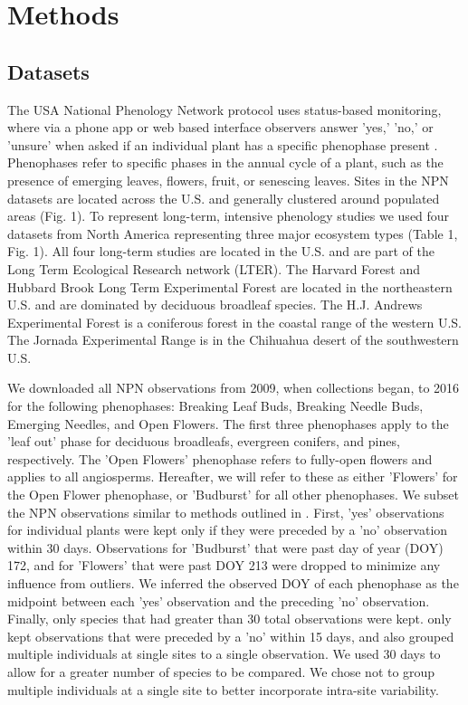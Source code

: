 \documentclass[fleqn,12pt,lineno]{article}
\begin{document}
\section*{Methods}

\subsection*{Datasets}

The USA National Phenology Network protocol uses status-based monitoring, where via a phone app or web based interface observers answer 'yes,' 'no,' or 'unsure' when asked if an individual plant has a specific phenophase present \citep{denny2014}. Phenophases refer to specific phases in the annual cycle of a plant, such as the presence of emerging leaves, flowers, fruit, or senescing leaves. Sites in the NPN datasets are located across the U.S. and generally clustered around populated areas (Fig. 1). To represent long-term, intensive phenology studies we used four datasets from North America representing three major ecosystem types (Table 1, Fig. 1). All four long-term studies are located in the U.S. and are part of the Long Term Ecological Research network (LTER). The Harvard Forest and Hubbard Brook Long Term Experimental Forest are located in the northeastern U.S. and are dominated by deciduous broadleaf species. The H.J. Andrews Experimental Forest is a coniferous forest in the coastal range of the western U.S. The Jornada Experimental Range is in the Chihuahua desert of the southwestern U.S. 

We downloaded all NPN observations from 2009, when collections began, to 2016 for the following phenophases: Breaking Leaf Buds, Breaking Needle Buds, Emerging Needles, and Open Flowers. The first three phenophases apply to the 'leaf out' phase for deciduous broadleafs, evergreen conifers, and pines, respectively. The 'Open Flowers' phenophase refers to fully-open flowers and applies to all angiosperms. Hereafter, we will refer to these as either 'Flowers' for the Open Flower phenophase, or 'Budburst' for all other phenophases. We subset the NPN observations similar to methods outlined in \cite{crimmins2017}. First, 'yes' observations for individual plants were kept only if they were preceded by a 'no' observation within 30 days. Observations for 'Budburst' that were past day of year (DOY) 172, and for 'Flowers' that were past DOY 213 were dropped to minimize any influence from outliers. We inferred the observed DOY of each phenophase as the midpoint between each 'yes' observation and the preceding 'no' observation. Finally, only species that had greater than 30 total observations were kept. \cite{crimmins2017} only kept observations that were preceded by a 'no' within 15 days, and also grouped multiple individuals at single sites to a single observation. We used 30 days to allow for a greater number of species to be compared. We chose not to group multiple individuals at a single site to better incorporate intra-site variability.
\end{document}

